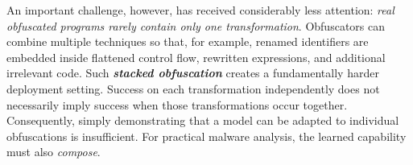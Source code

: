 An important challenge, however, has received considerably less
attention: \emph{real obfuscated programs rarely contain only one
transformation}. Obfuscators can combine multiple techniques so that,
for example, renamed identifiers are embedded inside flattened control
flow, rewritten expressions, and additional irrelevant code. Such
{\bf \em stacked obfuscation} creates a fundamentally harder deployment
setting. Success on each transformation independently does not
necessarily imply success when those transformations occur together.
Consequently, simply demonstrating that a model can be adapted to
individual obfuscations is insufficient. For practical malware
analysis, the learned capability must also \emph{compose}.



